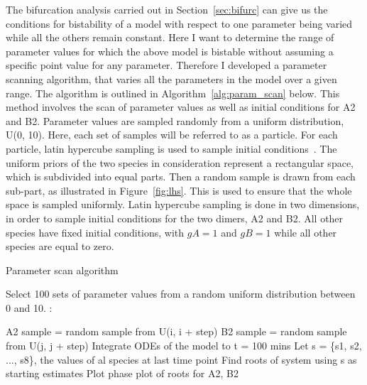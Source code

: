 The bifurcation analysis carried out in Section~\ref{sec:bifurc} can give us the conditions for bistability of a model with respect to one parameter being varied while all the others remain constant. Here I want to determine the range of parameter values for which the above model is bistable without assuming a specific point value for any parameter. Therefore I developed a parameter scanning algorithm, that varies all the parameters in the model over a given range. The algorithm is outlined in Algorithm~\ref{alg:param_scan} below. This method involves the scan of parameter values as well as initial conditions for A2 and B2. Parameter values are sampled randomly from a uniform distribution, U(0, 10). Here, each set of samples will be referred to as a particle. For each particle, latin hypercube sampling is used to sample initial conditions~\autocite{MCKAY:2000vt}. The uniform priors of the two species in consideration represent a rectangular space, which is subdivided into equal parts. Then a random sample is drawn from each sub-part, as illustrated in Figure~\ref{fig:lhs}. This is used to ensure that the whole space is sampled uniformly. Latin hypercube sampling is done in two dimensions, in order to sample initial conditions for the two dimers, A2 and B2. All other species have fixed initial conditions, with $gA = 1$ and $gB = 1$ while all other species are equal to zero. 

\begin{algorithm}[htbp]
\caption{Parameter scan algorithm}
\label{alg:param_scan}
 \begin{algorithmic}[1]
    \Statex
	\State Select 100 sets of parameter values from a random uniform distribution between 0 and 10.
	:
		
				\State A2 sample = random sample from U(i, i + step) 
				\State B2 sample = random sample from U(j, j + step) 
			\EndFor
		\EndFor
	\State Integrate ODEs of the model to t = 100 mins
	\State Let s = \{s1, s2, ..., s8\}, the values of al species at last time point
	\State Find roots of system using s as starting estimates 
	\EndFor
	\State Plot phase plot of roots for A2, B2
	\EndFor
  \end{algorithmic} 
\end{algorithm}

